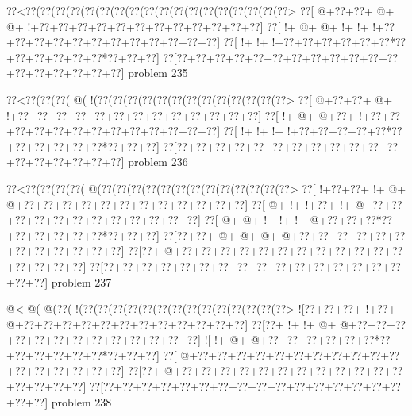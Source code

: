 \vbox{\vbox{\goo
\0??<\0??(\0??(\0??(\0??(\0??(\0??(\0??(\0??(\0??(\0??(\0??(\0??(\0??(\0??(\0??(\0??(\0??(\0??>
\0??[\- @+\0??+\0??+\- @+\- @+\- !+\0??+\0??+\0??+\0??+\0??+\0??+\0??+\0??+\0??+\0??+\0??+\0??]
\0??[\- !+\- @+\- @+\- !+\- !+\- !+\0??+\0??+\0??+\0??+\0??+\0??+\0??+\0??+\0??+\0??+\0??+\0??]
\0??[\- !+\- !+\- !+\0??+\0??+\0??+\0??+\0??+\0??*\0??+\0??+\0??+\0??+\0??+\0??*\0??+\0??+\0??]
\0??[\0??+\0??+\0??+\0??+\0??+\0??+\0??+\0??+\0??+\0??+\0??+\0??+\0??+\0??+\0??+\0??+\0??+\0??]
}
\hfil problem 235\hfil\break
}



\vbox{\vbox{\goo
\0??<\0??(\0??(\0??(\- @(\- !(\0??(\0??(\0??(\0??(\0??(\0??(\0??(\0??(\0??(\0??(\0??(\0??(\0??>
\0??[\- @+\0??+\0??+\- @+\- !+\0??+\0??+\0??+\0??+\0??+\0??+\0??+\0??+\0??+\0??+\0??+\0??+\0??]
\0??[\- !+\- @+\- @+\0??+\- !+\0??+\0??+\0??+\0??+\0??+\0??+\0??+\0??+\0??+\0??+\0??+\0??+\0??]
\0??[\- !+\- !+\- !+\- !+\0??+\0??+\0??+\0??+\0??*\0??+\0??+\0??+\0??+\0??+\0??*\0??+\0??+\0??]
\0??[\0??+\0??+\0??+\0??+\0??+\0??+\0??+\0??+\0??+\0??+\0??+\0??+\0??+\0??+\0??+\0??+\0??+\0??]
}
\hfil problem 236\hfil\break
}



\vbox{\vbox{\goo
\0??<\0??(\0??(\0??(\0??(\- @(\0??(\0??(\0??(\0??(\0??(\0??(\0??(\0??(\0??(\0??(\0??(\0??(\0??>
\0??[\- !+\0??+\0??+\- !+\- @+\- @+\0??+\0??+\0??+\0??+\0??+\0??+\0??+\0??+\0??+\0??+\0??+\0??]
\0??[\- @+\- !+\- !+\0??+\- !+\- @+\0??+\0??+\0??+\0??+\0??+\0??+\0??+\0??+\0??+\0??+\0??+\0??]
\0??[\- @+\- @+\- !+\- !+\- !+\- @+\0??+\0??+\0??*\0??+\0??+\0??+\0??+\0??+\0??*\0??+\0??+\0??]
\0??[\0??+\0??+\- @+\- @+\- @+\- @+\0??+\0??+\0??+\0??+\0??+\0??+\0??+\0??+\0??+\0??+\0??+\0??]
\0??[\0??+\- @+\0??+\0??+\0??+\0??+\0??+\0??+\0??+\0??+\0??+\0??+\0??+\0??+\0??+\0??+\0??+\0??]
\0??[\0??+\0??+\0??+\0??+\0??+\0??+\0??+\0??+\0??+\0??+\0??+\0??+\0??+\0??+\0??+\0??+\0??+\0??]
}
\hfil problem 237\hfil\break
}



\vbox{\vbox{\goo
\- @<\- @(\- @(\0??(\- !(\0??(\0??(\0??(\0??(\0??(\0??(\0??(\0??(\0??(\0??(\0??(\0??(\0??(\0??>
\- ![\0??+\0??+\0??+\- !+\0??+\- @+\0??+\0??+\0??+\0??+\0??+\0??+\0??+\0??+\0??+\0??+\0??+\0??]
\0??[\0??+\- !+\- !+\- @+\- @+\0??+\0??+\0??+\0??+\0??+\0??+\0??+\0??+\0??+\0??+\0??+\0??+\0??]
\- ![\- !+\- @+\- @+\0??+\0??+\0??+\0??+\0??+\0??*\0??+\0??+\0??+\0??+\0??+\0??*\0??+\0??+\0??]
\0??[\- @+\0??+\0??+\0??+\0??+\0??+\0??+\0??+\0??+\0??+\0??+\0??+\0??+\0??+\0??+\0??+\0??+\0??]
\0??[\0??+\- @+\0??+\0??+\0??+\0??+\0??+\0??+\0??+\0??+\0??+\0??+\0??+\0??+\0??+\0??+\0??+\0??]
\0??[\0??+\0??+\0??+\0??+\0??+\0??+\0??+\0??+\0??+\0??+\0??+\0??+\0??+\0??+\0??+\0??+\0??+\0??]
}
\hfil problem 238\hfil\break
}




